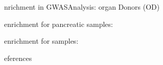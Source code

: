 \begin{frame}{nrichment in GWAS}{Analysis: organ Donors (OD)}
\begin{center}
\par{ enrichment for  pancreatic samples:\\

}
\vspace{2em}
\par{ enrichment for  samples:\\

}
\end{center}
\end{frame}

% 
% 

\begin{frame}[allowframebreaks]{eferences}{}%
{\small
    
    
}
\end{frame}


